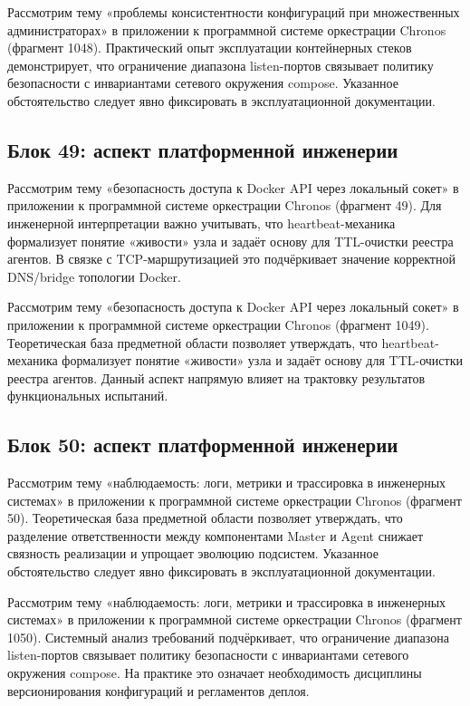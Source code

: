  Рассмотрим тему «проблемы консистентности конфигураций при множественных администраторах» в приложении к программной системе оркестрации Chronos (фрагмент 1048). Практический опыт эксплуатации контейнерных стеков демонстрирует, что ограничение диапазона listen-портов связывает политику безопасности с инвариантами сетевого окружения compose. Указанное обстоятельство следует явно фиксировать в эксплуатационной документации.

\subsection{Блок 49: аспект платформенной инженерии}
 Рассмотрим тему «безопасность доступа к Docker API через локальный сокет» в приложении к программной системе оркестрации Chronos (фрагмент 49). Для инженерной интерпретации важно учитывать, что heartbeat-механика формализует понятие «живости» узла и задаёт основу для TTL-очистки реестра агентов. В связке с TCP-маршрутизацией это подчёркивает значение корректной DNS/bridge топологии Docker.

 Рассмотрим тему «безопасность доступа к Docker API через локальный сокет» в приложении к программной системе оркестрации Chronos (фрагмент 1049). Теоретическая база предметной области позволяет утверждать, что heartbeat-механика формализует понятие «живости» узла и задаёт основу для TTL-очистки реестра агентов. Данный аспект напрямую влияет на трактовку результатов функциональных испытаний.

\subsection{Блок 50: аспект платформенной инженерии}
 Рассмотрим тему «наблюдаемость: логи, метрики и трассировка в инженерных системах» в приложении к программной системе оркестрации Chronos (фрагмент 50). Теоретическая база предметной области позволяет утверждать, что разделение ответственности между компонентами Master и Agent снижает связность реализации и упрощает эволюцию подсистем. Указанное обстоятельство следует явно фиксировать в эксплуатационной документации.

 Рассмотрим тему «наблюдаемость: логи, метрики и трассировка в инженерных системах» в приложении к программной системе оркестрации Chronos (фрагмент 1050). Системный анализ требований подчёркивает, что ограничение диапазона listen-портов связывает политику безопасности с инвариантами сетевого окружения compose. На практике это означает необходимость дисциплины версионирования конфигураций и регламентов деплоя.

